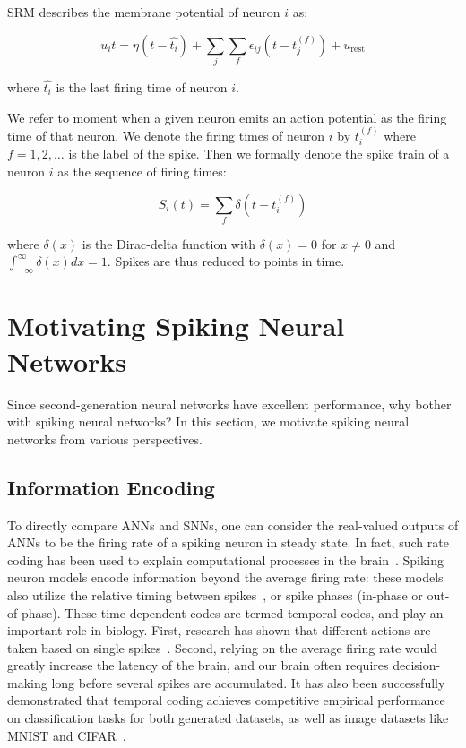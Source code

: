 \documentclass[fyp]{socreport}
\begin{document}
SRM describes the membrane potential of neuron \(i\) as:

\begin{equation} u_i{t} = \eta (t - \hat{t_i}) + \sum_{j}\sum_{f} \epsilon_{ij}(t - t_j^{(f)}) + u_{\text{rest}}
\end{equation}

where \(\hat{t_i}\) is the last firing time of neuron \(i\).

We refer to moment when a given neuron emits an action potential as the firing
time of that neuron. We denote the firing times of neuron \(i\) by \(t_i^{(f)}\)
where \(f = 1,2,\dots\) is the label of the spike.  Then we formally denote the
spike train of a neuron \(i\) as the sequence of firing times:

\begin{equation} S_i(t) = \sum_{f} \delta\left( t - t_i^{(f)} \right)
\end{equation}

where \(\delta(x)\) is the Dirac-delta function with \(\delta(x) = 0\) for
\(x \ne 0\) and \(\int_{-\infty}^{\infty} \delta(x)dx = 1\). Spikes are thus
reduced to points in time.

\section{Motivating Spiking Neural Networks\label{sec:motiv-spik-neur}}

Since second-generation neural networks have excellent performance, why bother
with spiking neural networks? In this section, we motivate spiking neural
networks from various perspectives.

\subsection{Information Encoding}

To directly compare ANNs and SNNs, one can consider the real-valued outputs of
ANNs to be the firing rate of a spiking neuron in steady state. In fact, such
rate coding has been used to explain computational processes in the
brain~\cite{pfeiffer2018deep}. Spiking neuron models encode information beyond
the average firing rate: these models also utilize the relative timing between
spikes~\cite{guetig14_to_spike_or_when_to_spike}, or spike phases (in-phase or
out-of-phase). These time-dependent codes are termed temporal codes, and play an
important role in biology. First, research has shown that different actions are
taken based on single spikes~\cite{stemmler96_singl_spike_suffic}. Second,
relying on the average firing rate would greatly increase the latency of the
brain, and our brain often requires decision-making long before several spikes
are accumulated.  It has also been successfully demonstrated that temporal
coding achieves competitive empirical performance on classification tasks for
both generated datasets, as well as image datasets like MNIST and
CIFAR~\cite{comsa19_tempor_codin_spikin_neural_networ}.
\end{document}
